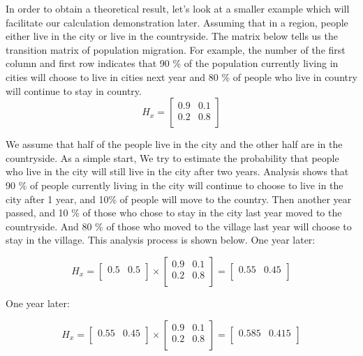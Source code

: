 In order to obtain a theoretical result, let's look at a smaller example which will facilitate our  calculation demonstration later. Assuming that in a region, people either live in the city or live in the countryside. The matrix below tells us the transition matrix of population migration. For example, the number of the first column  and first row indicates that 90 \% of the population currently living in cities will choose to  live in cities next year and 80 \% of people who live in country will continue to stay in country.
$$
H_x={
\left[ \begin{array}{ccc}
0.9 & 0.1 \\
0.2 & 0.8\\
\end{array}
\right ]}
$$

We assume that half of the people live in the city and the other half are in the countryside. As a simple start, We try to estimate the probability that people who live in the city will still live in the city after two years. Analysis shows that 90 \% of people currently living in the city will continue to choose to live in the city after 1 year, and 10\% of people will move to the country. Then another year passed, and 10 \% of those who chose to stay in the city last year moved to the countryside. And 80 \% of those who moved to the village last year will choose to stay in the village. This analysis process is shown  below.
One year later:

$$
H_x=  {
\left[ \begin{array}{ccc}
0.5  & 0.5 \\
\end{array}
\right ]}
\times{
\left[ \begin{array}{ccc}
0.9 & 0.1 \\
0.2 & 0.8\\
\end{array}
\right ]}
=
{
\left[ \begin{array}{ccc}
0.55 & 0.45 \\
\end{array}
\right ]}
$$

One year later:

$$
H_x=  {
\left[ \begin{array}{ccc}
0.55 & 0.45 \\
\end{array}
\right ]}
\times{
\left[ \begin{array}{ccc}
0.9 & 0.1 \\
0.2 & 0.8\\
\end{array}
\right ]}
=
{
\left[ \begin{array}{ccc}
0.585 & 0.415 \\
\end{array}
\right ]}
$$


